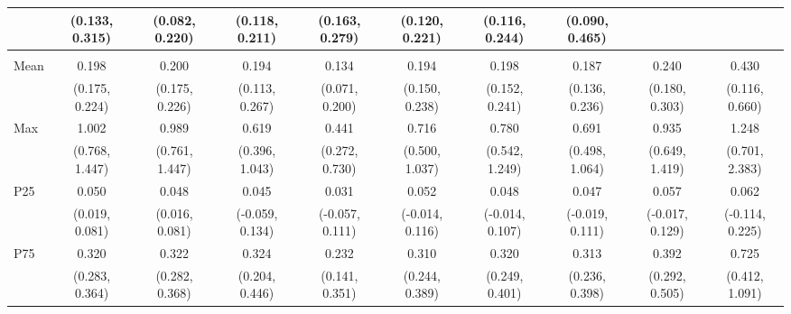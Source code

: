 {\begin{tabular}{l|c|c|c|c|c|c|c|c|c}
& {\scriptsize (0.133, 0.315)}
& {\scriptsize (0.082, 0.220)}
& {\scriptsize (0.118, 0.211)}
& {\scriptsize (0.163, 0.279)}
& {\scriptsize (0.120, 0.221)}
& {\scriptsize (0.116, 0.244)}
& {\scriptsize (0.090, 0.465)}
\\ [0.1cm]
\hline
\noalign{\smallskip}
\multicolumn{10}{l}{\textbf{Effect with Leads and Lags}} \\
\noalign{\smallskip}
\hline
Mean
& 0.198 & 0.200 & 0.194 & 0.134 & 0.194 & 0.198 & 0.187 & 0.240 & 0.430 \\
& {\scriptsize (0.175, 0.224)}
& {\scriptsize (0.175, 0.226)}
& {\scriptsize (0.113, 0.267)}
& {\scriptsize (0.071, 0.200)}
& {\scriptsize (0.150, 0.238)}
& {\scriptsize (0.152, 0.241)}
& {\scriptsize (0.136, 0.236)}
& {\scriptsize (0.180, 0.303)}
& {\scriptsize (0.116, 0.660)}
\\ [0.1cm]
\hline
Max
& 1.002 & 0.989 & 0.619 & 0.441 & 0.716 & 0.780 & 0.691 & 0.935 & 1.248 \\
& {\scriptsize (0.768, 1.447)}
& {\scriptsize (0.761, 1.447)}
& {\scriptsize (0.396, 1.043)}
& {\scriptsize (0.272, 0.730)}
& {\scriptsize (0.500, 1.037)}
& {\scriptsize (0.542, 1.249)}
& {\scriptsize (0.498, 1.064)}
& {\scriptsize (0.649, 1.419)}
& {\scriptsize (0.701, 2.383)}
\\ [0.1cm]
\hline
P25
& 0.050 & 0.048 & 0.045 & 0.031 & 0.052 & 0.048 & 0.047 & 0.057 & 0.062 \\
& {\scriptsize (0.019, 0.081)}
& {\scriptsize (0.016, 0.081)}
& {\scriptsize (-0.059, 0.134)}
& {\scriptsize (-0.057, 0.111)}
& {\scriptsize (-0.014, 0.116)}
& {\scriptsize (-0.014, 0.107)}
& {\scriptsize (-0.019, 0.111)}
& {\scriptsize (-0.017, 0.129)}
& {\scriptsize (-0.114, 0.225)}
\\ [0.1cm]
\hline
P75
& 0.320 & 0.322 & 0.324 & 0.232 & 0.310 & 0.320 & 0.313 & 0.392 & 0.725 \\
& {\scriptsize (0.283, 0.364)}
& {\scriptsize (0.282, 0.368)}
& {\scriptsize (0.204, 0.446)}
& {\scriptsize (0.141, 0.351)}
& {\scriptsize (0.244, 0.389)}
& {\scriptsize (0.249, 0.401)}
& {\scriptsize (0.236, 0.398)}
& {\scriptsize (0.292, 0.505)}
& {\scriptsize (0.412, 1.091)}
\\ [0.1cm]
\hline
\hline
\end{tabular}
}
